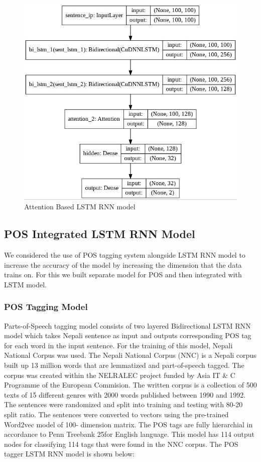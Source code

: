         \begin{figure}[hbt!]
            \centering
                \includegraphics[width=1\textwidth]{./img/6.17.jpg}
                \caption{Attention Based LSTM RNN model}
        \end{figure}
        \subsection{POS Integrated LSTM RNN Model}
We considered the use of POS tagging system alongside LSTM RNN model to increase
the accuracy of the model by increasing the dimension that the data trains on. For this
we built separate model for POS and then integrated with LSTM model.
            \subsubsection{POS Tagging Model}
Parts-of-Speech tagging model consists of two layered Bidirectional LSTM RNN
model which takes Nepali sentence as input and outputs corresponding POS tag for
each word in the input sentence. For the training of this model, Nepali National Corpus
was used. The Nepali National Corpus (NNC) is a Nepali corpus built up 13 million
words that are lemmatized and part-of-speech tagged. The corpus was created within
the NELRALEC project funded by Asia IT & C Programme of the European
Commision. The written corpus is a collection of 500 texts of 15 different genres with
2000 words published between 1990 and 1992. The sentences were randomized and
split into training and testing with 80-20 split ratio.
The sentences were converted to vectors using the pre-trained Word2vec model of 100-
dimension matrix. The POS tags are fully hierarchial in accordance to Penn Treebank
25for English language. This model has 114 output nodes for classifying 114 tags that
were found in the NNC corpus.
The POS tagger LSTM RNN model is shown below:

